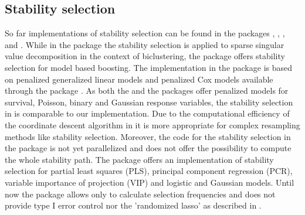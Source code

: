 \documentclass[nojss]{jss}
\begin{document}
\subsection{Stability selection}

So far implementations of stability selection can be found in the packages , \citep{s4vd,sill2011robust},  \citep{mboost},  \citep{lol} and  \citep{BioMark}. While in the package  the stability selection is applied to sparse singular value decomposition in the context of biclustering, the  package offers stability selection for model based boosting. The implementation in the  package is based on penalized generalized linear models and penalized Cox models available through the package  \citep{penalized}.  As both the  and the  packages offer penalized models for survival, Poisson, binary and Gaussian response variables, the stability selection in  is comparable to our implementation. Due to the computational efficiency of the coordinate descent algorithm in  it is more appropriate for complex resampling methods like stability selection. Moreover, the code for the stability selection in the  package is not yet parallelized and does not offer the possibility to compute the whole stability path. The  package offers an implementation of stability selection for partial least squares (PLS), principal component regression (PCR), variable importance of projection (VIP) and logistic and Gaussian  models. Until now the  package allows only to calculate selection frequencies and does not provide type I error control nor the 'randomized lasso' as described in \citet{MeinshausenBuehlmann2010}. \\
\end{document}
